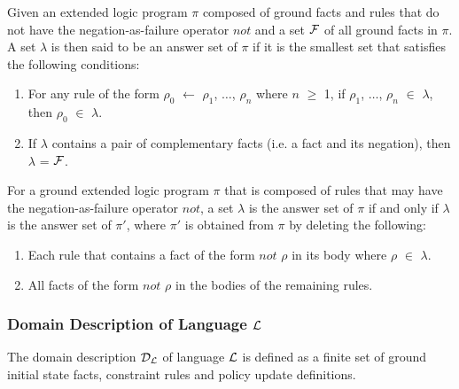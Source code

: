 \documentclass[global,twocolumn,final]{svjour}
\newenvironment{vdefinition}
  {\begin{definition}\hspace{0.25em}}
  {\end{definition}}
\begin{document}
      \begin{vdefinition}
        \label{def-ans}
        Given an extended logic program $\pi$ composed of ground facts and
        rules that do not have the negation-as-failure operator $not$ and a set
        ${\cal F}$ of all ground facts in $\pi$. A set $\lambda$ is then said to
        be an answer set of $\pi$ if it is the smallest set that satisfies the
        following conditions:

        \begin{enumerate}
          \item
            For any rule of the form $\rho_{0}$ $\leftarrow$ $\rho_{1}$,
            $\hdots$, $\rho_{n}$ where $n$ $\geq$ 1, if $\rho_{1}$, $\hdots$,
            $\rho_{n}$ $\in$ $\lambda$, then
            $\rho_{0}$ $\in$ $\lambda$.
          \item
            If $\lambda$ contains a pair of complementary facts (i.e. a fact and
            its negation), then $\lambda$ = ${\cal F}$.
        \end{enumerate}

        For a ground extended logic program $\pi$ that is composed of rules
        that may have the negation-as-failure operator $not$, a set $\lambda$ is
        the answer set of $\pi$ if and only if $\lambda$ is the answer set of
        $\pi'$, where $\pi'$ is obtained from $\pi$ by deleting the following:

        \begin{enumerate}
          \item
            Each rule that contains a fact of the form $not$ $\rho$ in its body
            where $\rho$ $\in$ $\lambda$.
          \item
            All facts of the form $not$ $\rho$ in the bodies of the remaining
            rules.
        \end{enumerate}
      \end{vdefinition}

      \subsubsection{Domain Description of Language ${\cal L}$}
        \begin{vdefinition}
          \label{def-domain}
          The domain description ${\cal D}_{\cal L}$ of language ${\cal L}$ is
          defined as a finite set of ground initial state facts, constraint
          rules and policy update definitions.
        \end{vdefinition}
\end{document}
